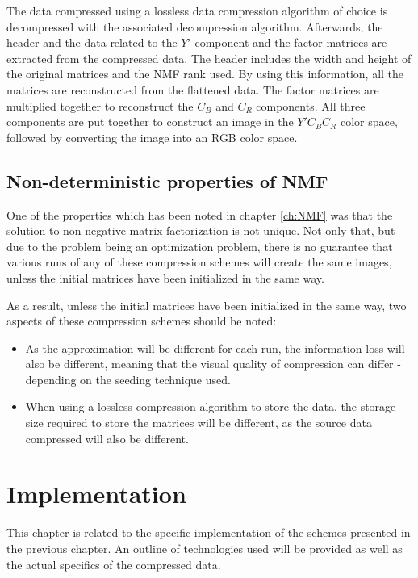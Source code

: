 \documentclass[thesis=M,english]{FITthesis}[2012/10/20]
\begin{document}
The data compressed using a lossless data compression algorithm of choice is decompressed
with the associated decompression algorithm. Afterwards, the header and the data related to the $Y'$ component and the factor matrices
are extracted from the compressed data. The header includes the width and height of the
original matrices and the NMF rank used. By using this information, all the matrices
are reconstructed from the flattened data. The factor matrices are multiplied together
to reconstruct the $C_B$ and $C_R$ components. All three components are put together
to construct an image in the $Y'C_BC_R$ color space, followed by converting the
image into an RGB color space.


\section{Non-deterministic properties of NMF}
One of the properties which has been noted in chapter \ref{ch:NMF} was that
the solution to non-negative matrix factorization is not unique. Not only that,
but due to the problem being an optimization problem, there is no guarantee that
various runs of any of these compression schemes will create the same images, unless
the initial matrices have been initialized in the same way.

As a result, unless the initial matrices have been initialized in the same way,
two aspects of these compression schemes should be noted:
\begin{itemize}
  \item As the approximation will be different for each run, the information loss will
  also be different, meaning that the visual quality of compression can differ - depending
  on the seeding technique used.
  \item When using a lossless compression algorithm to store the data, the storage size required
  to store the matrices will be different, as the source data compressed will also
  be different.
\end{itemize}


\chapter{Implementation}
\label{ch:implementation}
This chapter is related to the specific implementation of the schemes presented in the
previous chapter. An outline of technologies used will be provided as well as the actual
specifics of the compressed data.
\end{document}
